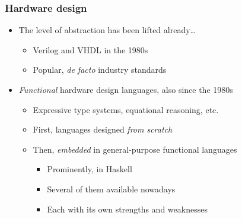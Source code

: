         \begin{frame}
            \frametitle{Hardware design}

            \begin{itemize}
                \item The level of abstraction has been lifted already\ldots
                    \begin{itemize}
                        \item Verilog and VHDL in the 1980s
                        \item Popular, \emph{de facto} industry standards
                    \end{itemize}
                \vspace{0.3cm}
                \item \emph{Functional} hardware design languages, also since the 1980s
                    \begin{itemize}
                        \item Expressive type systems, equational reasoning, etc.
                        \item First, languages designed \emph{from scratch}
                        \item Then, \emph{embedded} in general-purpose functional languages
                            \begin{itemize}
                                \item Prominently, in Haskell
                                \item Several of them available nowadays
                                \item Each with its own strengths and weaknesses
                            \end{itemize}
                    \end{itemize}
            \end{itemize}

        \end{frame}

